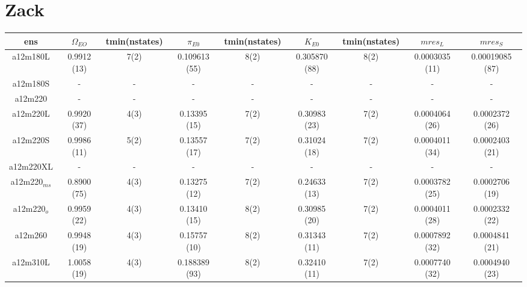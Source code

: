 \documentclass{article}
\begin{document}
\section*{Zack}
\begin{table}[h!]
  \centering
 \setlength{\arrayrulewidth}{0.5mm}
\setlength{\tabcolsep}{13pt}
\renewcommand{\arraystretch}{2}
 \begin{tabular}{|| c |c | c | c | c | c | c | c | c ||} 
 \hline
 ens &  $\Omega_{EO}$ & tmin(nstates) & $\pi_{E0}$  & tmin(nstates)& $K_{E0}$  & tmin(nstates) & $mres_{L}$ & $mres_{S}$\\ [0.8ex] 
 \hline\hline
 a12m180L 
 & {0.9912 (13)}   &   {7(2)} & {0.109613 (55)}   & {8(2)}   & {0.305870 (88)}  & {8(2)}   & {0.0003035 (11)}  & {0.00019085 (87)}  \\ 
 \hline
 a12m180S 
 & {-}   &   {-} & {-}   & {-}   & {-}  & {-}   & {-}  & {-}  \\
 \hline
 a12m220 
 & {-}   &   {-} & {-}   & {-}   & {-}  & {-}   & {-}  & {-}  \\
 \hline
 a12m220L 
 & {0.9920 (37)}   &   {4(3)} & {0.13395 (15)}   & {7(2)}   & {0.30983 (23)}  & {7(2)}   & {0.0004064 (26)}  & {0.0002372 (26)}  \\
 \hline
 a12m220S
 & {0.9986 (11)}   &   {5(2)} & {0.13557 (17)}   & {7(2)}   & {0.31024 (18)}  & {7(2)}   & {0.0004011 (34)}  & {0.0002403 (21)}  \\
 \hline
 a12m220XL
 & {-}   &   {-} & {-}   & {-}   & {-}  & {-}   & {-}  & {-}  \\
 \hline
 a12m220$_{ms}$
 & {0.8900 (75)}   &   {4(3)} & {0.13275 (12)}   & {7(2)}   & {0.24633 (13)}  & {7(2)}   & {0.0003782 (25)}  & {0.0002706 (19)}  \\
 \hline
 a12m220$_o$ 
 & {0.9959 (22)}   &   {4(3)} & {0.13410 (15)}   & {8(2)}   & {0.30985 (20)}  & {7(2)}   & {0.0004011 (28)}  & {0.0002332 (22)}  \\
 \hline
 a12m260 
 & {0.9948 (19)}   &   {4(3)} & {0.15757 (10)}   & {8(2)}   & {0.31343 (11)}  & {7(2)}   & {0.0007892 (32)}  & {0.0004841 (21)}  \\
 \hline

 a12m310L
 & {1.0058 (19)}   &   {4(3)} & {0.188389 (93)}   & {8(2)}   & {0.32410 (11)}  & {7(2)}   & {0.0007740 (32)}  & {0.0004940 (23)}  \\
 \hline
 
 
 \end{tabular}
\end{table}
\clearpage

\newpage
\end{document}

